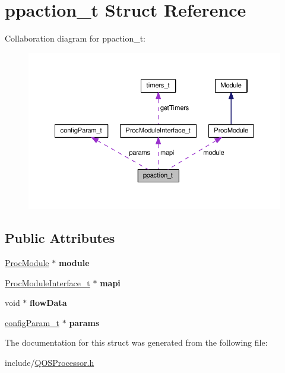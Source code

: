 \hypertarget{structppaction__t}{}\section{ppaction\+\_\+t Struct Reference}
\label{structppaction__t}


Collaboration diagram for ppaction\+\_\+t\+:
\nopagebreak
\begin{figure}[H]
\begin{center}
\leavevmode
\includegraphics[width=350pt]{structppaction__t__coll__graph}
\end{center}
\end{figure}
\subsection*{Public Attributes}
\begin{DoxyCompactItemize}
\item 
\mbox{\label{structppaction__t_aacb8715e6ca2050f983fca8852f0c789}} 
\hyperlink{classProcModule}{Proc\+Module} $\ast$ {\bfseries module}
\item 
\mbox{\label{structppaction__t_a1538e65dcb9e5caa38817cf777e303b6}} 
\hyperlink{structProcModuleInterface__t}{Proc\+Module\+Interface\+\_\+t} $\ast$ {\bfseries mapi}
\item 
\mbox{\label{structppaction__t_ab277d78a7f33eea3935df8fd942693bc}} 
void $\ast$ {\bfseries flow\+Data}
\item 
\mbox{\label{structppaction__t_af241587678add3ae9f2cea09f3468613}} 
\hyperlink{structconfigParam__t}{config\+Param\+\_\+t} $\ast$ {\bfseries params}
\end{DoxyCompactItemize}


The documentation for this struct was generated from the following file\+:\begin{DoxyCompactItemize}
\item 
include/\hyperlink{QOSProcessor_8h}{Q\+O\+S\+Processor.\+h}\end{DoxyCompactItemize}
